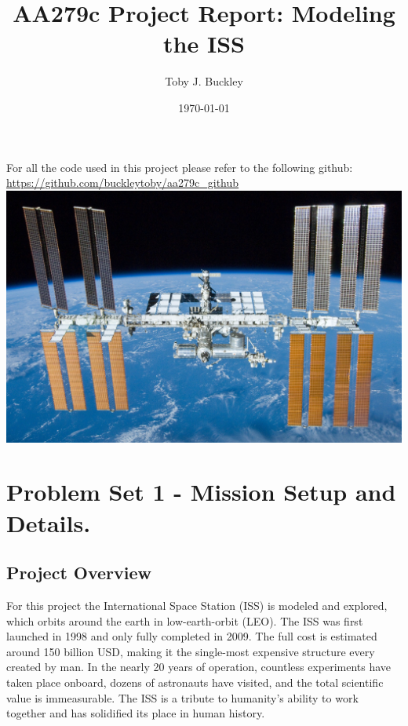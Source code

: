 \documentclass[12pt, letterpaper]{article}
\title{AA279c Project Report: Modeling the ISS}
\author{Toby J. Buckley}
\date{\today}
\begin{document}
\begin{titlepage}
	\maketitle
	\centering
	For all the code used in this project please refer to the following github:
	\url{https://github.com/buckleytoby/aa279c_github}
	\\
	\includegraphics[width=\textwidth]{ISS}
\end{titlepage}


\tableofcontents





\section{Problem Set 1 - Mission Setup and Details.}
\subsection{Project Overview}
For this project the International Space Station (ISS) is modeled and explored, which orbits around the earth in low-earth-orbit (LEO). The ISS was first launched in 1998 and only fully completed in 2009. The full cost is estimated around 150 billion USD, making it the single-most expensive structure every created by man. In the nearly 20 years of operation, countless experiments have taken place onboard, dozens of astronauts have visited, and the total scientific value is immeasurable. The ISS is a tribute to humanity's ability to work together and has solidified its place in human history.
\end{document}
